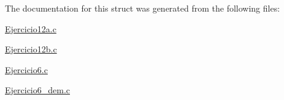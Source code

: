 The documentation for this struct was generated from the following files\+:\begin{DoxyCompactItemize}
\item 
\hyperlink{Ejercicio12a_8c}{Ejercicio12a.\+c}\item 
\hyperlink{Ejercicio12b_8c}{Ejercicio12b.\+c}\item 
\hyperlink{Ejercicio6_8c}{Ejercicio6.\+c}\item 
\hyperlink{Ejercicio6__dem_8c}{Ejercicio6\+\_\+dem.\+c}\end{DoxyCompactItemize}
